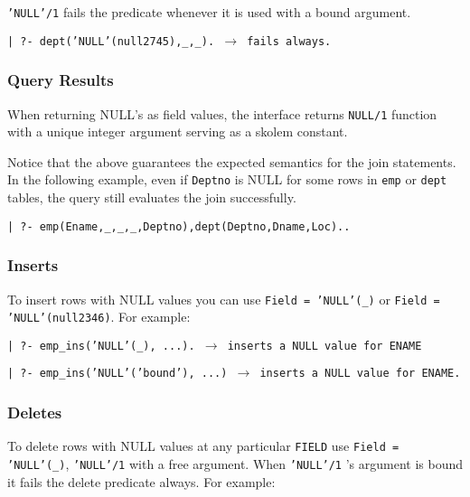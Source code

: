 {\tt 'NULL'/1} fails the predicate whenever it is
used with a bound argument.
\begin{center}

{\tt | ?- dept('NULL'(null2745),\_,\_). $\rightarrow$ fails always.}
\end{center}


\subsubsection{Query Results}
When returning NULL's as field values, the interface returns {\tt NULL/1} 
function with a unique integer argument serving as a skolem constant.

Notice that the above guarantees the expected semantics for the join 
statements.  In the following example, even if {\tt Deptno} is NULL for some rows in {\tt emp} or {\tt dept} tables, the query still evaluates the join successfully.
\begin{center}

{\tt | ?- emp(Ename,\_,\_,\_,Deptno),dept(Deptno,Dname,Loc)..}
\end{center}

\subsubsection{Inserts}

To insert rows with NULL values you can use {\tt Field = 'NULL'(\_)} or
{\tt Field = 'NULL'(null2346)}.  For example:

\begin{center}

{\tt | ?- emp\_ins('NULL'(\_), ...).  $\rightarrow$ inserts a NULL value for ENAME}
\end{center}
\begin{center}

{\tt | ?- emp\_ins('NULL'('bound'), ...) $\rightarrow$ inserts a NULL value for ENAME.}

\end{center}


\subsubsection{Deletes}


To delete rows with NULL values at any particular {\tt FIELD} use {\tt Field = 'NULL'(\_)}, {\tt 'NULL'/1} with a free argument.  When {\tt 'NULL'/1} 's argument
is bound it fails the delete predicate always.  For example:


